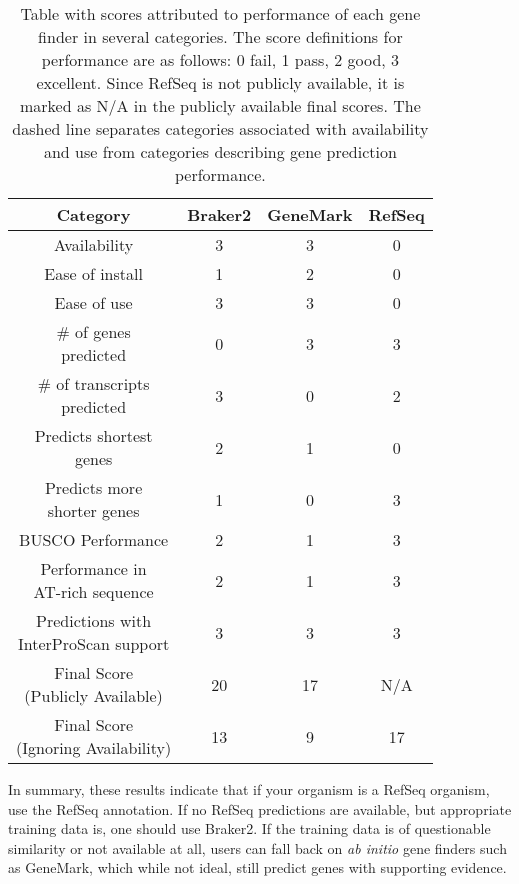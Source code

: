 \begin{table}
  \centering
  \begin{tabular}{|c|c|c|c|}
    \hline
    Category & Braker2 & GeneMark & RefSeq \\ \hline
    Availability & 3 & 3 & 0 \\ \hline
    Ease of install & 1 & 2 & 0 \\ \hline
    Ease of use & 3 & 3 & 0 \\ \hdashline
    \makecell{\# of genes\\predicted} & 0 & 3 & 3 \\ \hline
    \makecell{\# of transcripts\\predicted} & 3 & 0 & 2 \\ \hline
    \makecell{Predicts shortest\\genes} & 2 & 1 & 0 \\ \hline
    \makecell{Predicts more\\shorter genes} & 1 & 0 & 3 \\ \hline
    BUSCO Performance & 2 & 1 & 3 \\ \hline
    \makecell{Performance in\\AT-rich sequence} & 2 & 1 & 3 \\ \hline
    \makecell{Predictions with \\InterProScan support} & 3 & 3 & 3 \\ \hline
    \makecell{Final Score\\(Publicly Available)} & 20 & 17 & N/A \\ \hline
    \makecell{Final Score\\(Ignoring Availability)} & 13 & 9 & 17 \\ \hline
  \end{tabular}
  \caption[Final scoring table]{Table with scores attributed to
    performance of each gene finder in several categories. The score
    definitions for performance are as follows: 0 \- fail, 1 \- pass, 2
    \- good, 3 \- excellent. Since RefSeq is not publicly available, it is
    marked as N/A in the publicly available final scores. The dashed
    line separates categories associated with availability and use
    from categories describing gene prediction performance.}\label{table:final-score}
\end{table}

In summary, these results indicate that if your organism is a RefSeq
organism, use the RefSeq annotation. If no RefSeq predictions are
available, but appropriate training data is, one should use Braker2. If
the training data is of questionable similarity or not available at
all, users can fall back on \textit{ab initio} gene finders such as
GeneMark, which while not ideal, still predict genes with supporting
evidence.

